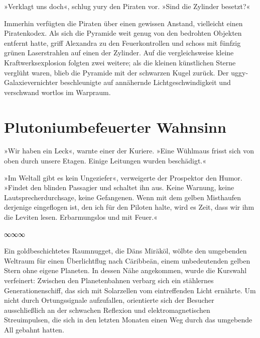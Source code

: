 »Verklagt uns doch«, schlug yury den Piraten vor. »Sind die Zylinder besetzt?«


Immerhin verfügten die Piraten über einen gewissen Anstand, vielleicht einen Piratenkodex. Als sich die Pyramide weit genug von den bedrohten Objekten entfernt hatte, griff Alexandra zu den Feuerkontrollen und schoss mit fünfzig grünen Laserstrahlen auf einen der Zylinder. Auf die vergleichsweise kleine Kraftwerksexplosion folgten zwei weitere; als die kleinen künstlichen Sterne verglüht waren, blieb die Pyramide mit der schwarzen Kugel zurück. Der uggy-Galaxievernichter beschleunigte auf annähernde Lichtgeschwindigkeit und verschwand wortlos im Warpraum.


\chapter{Plutoniumbefeuerter Wahnsinn}

»Wir haben ein Leck«, warnte einer der Kuriere. »Eine Wühlmaus frisst sich von oben durch unsere Etagen. Einige Leitungen wurden beschädigt.«

»Im Weltall gibt es kein Ungeziefer«, verweigerte der Prospektor den Humor. »Findet den blinden Passagier und schaltet ihn aus. Keine Warnung, keine Lautsprecherdurchsage, keine Gefangenen. Wenn mit dem gelben Misthaufen derjenige eingeflogen ist, den ich für den Piloten halte, wird es Zeit, dass wir ihm die Leviten lesen. Erbarmungslos und mit Feuer.«

\begin{center}
∞∞∞
\end{center}

Ein goldbeschichtetes Raumnugget, die Däns Miräköl, wölbte den umgebenden Weltraum für einen Überlichtflug nach Cäribbeän, einem unbedeutenden gelben Stern ohne eigene Planeten. In dessen Nähe angekommen, wurde die Kurswahl verfeinert: Zwischen den Planetenbahnen verbarg sich ein stählernes Generationenschiff, das sich mit Solarzellen vom eintreffenden Licht ernährte. Um nicht durch Ortungssignale aufzufallen, orientierte sich der Besucher ausschließlich an der schwachen Reflexion und elektromagnetischen Streuimpulsen, die sich in den letzten Monaten einen Weg durch das umgebende All gebahnt hatten.


